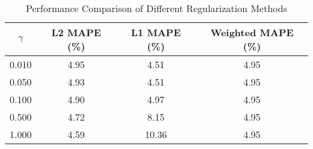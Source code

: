 \begin{table}[htbp]
\centering
\caption{Performance Comparison of Different Regularization Methods}
\label{tab:method_comparison}
\begin{tabular}{cccc}
\hline
$\gamma$ & L2 MAPE (\%) & L1 MAPE (\%) & Weighted MAPE (\%) \\
\hline
0.010 & 4.95 & 4.51 & 4.95 \\
0.050 & 4.93 & 4.51 & 4.95 \\
0.100 & 4.90 & 4.97 & 4.95 \\
0.500 & 4.72 & 8.15 & 4.95 \\
1.000 & 4.59 & 10.36 & 4.95 \\
\hline
\end{tabular}
\end{table}
